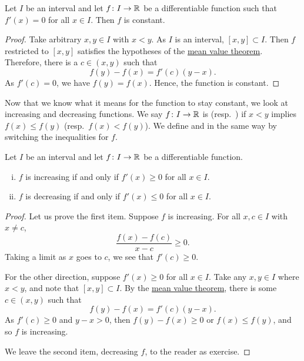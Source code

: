 \begin{prop} \label{prop:derzeroconst}
Let $I$ be an interval and
let $f \colon I \to {\mathbb{R}}$ be a differentiable function such that $f'(x) = 0$
for all $x \in I$.
Then $f$ is constant.
\end{prop}

\begin{proof}
Take arbitrary $x,y \in I$ with $x < y$.
As $I$ is an interval, $[x,y] \subset I$.
Then $f$ restricted to $[x,y]$ satisfies the hypotheses
of the \hyperref[thm:mvt]{mean value theorem}.
Therefore, there is a $c \in (x,y)$ such that
\begin{equation*}
f(y)-f(x) = f'(c)(y-x).
\end{equation*}
As $f'(c) = 0$, we have $f(y) = f(x)$.  Hence,
the function is constant.
\end{proof}

Now that we know what it means for the function to stay constant, we look
at increasing and decreasing functions.
We say $f \colon I \to {\mathbb{R}}$ is \emph{}
(resp.\  \emph{}) if
$x < y$ implies $f(x) \leq f(y)$ (resp.\ $f(x) < f(y)$).
We define
\emph{} and
\emph{} in the same way by switching the
inequalities for $f$.

\begin{prop} \label{incdecdiffprop}
Let $I$ be an interval and
let $f \colon I \to {\mathbb{R}}$ be a differentiable function.
\begin{enumerate}[(i)]
\item $f$ is increasing if and only if $f'(x) \geq 0$ for all $x \in I$.
\item $f$ is decreasing if and only if $f'(x) \leq 0$ for all $x \in I$.
\end{enumerate}
\end{prop}

\begin{proof}
Let us prove the first item.  Suppose $f$ is increasing.
For all $x,c \in I$ with $x \neq c$,
\begin{equation*}
\frac{f(x)-f(c)}{x-c} \geq 0 .
\end{equation*}
Taking a limit as $x$ goes to $c$, we see that $f'(c) \geq 0$.

For the other direction, suppose $f'(x) \geq 0$ for all $x \in I$.
Take any $x, y \in I$ where $x < y$, and note that $[x,y] \subset I$.
By the \hyperref[thm:mvt]{mean value theorem}, there is some $c \in (x,y)$ such that
\begin{equation*}
f(y)-f(x) = f'(c)(y-x) .
\end{equation*}
As $f'(c) \geq 0$ and $y-x > 0$, then $f(y) - f(x) \geq 0$ or $f(x) \leq
f(y)$, and so
$f$ is increasing.

We leave the second item, decreasing $f$, to the reader as exercise.
\end{proof}

